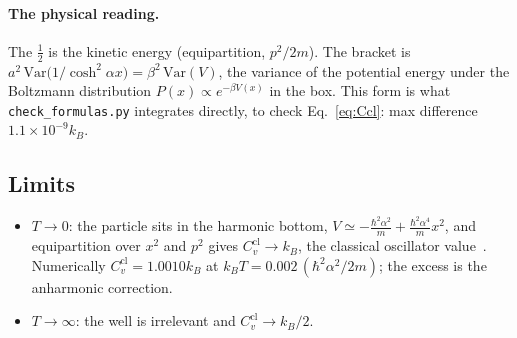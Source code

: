 \documentclass[11pt]{article}
\numberwithin{equation}{section}
\newcommand{\Ccl}{C_v^{\mathrm{cl}}}
\newcommand{\kB}{k_{B}}
\newcommand{\Eu}{\hbar^2\alpha^2/2m}
\begin{document}
\paragraph{The physical reading.} The $\frac12$ is the kinetic energy (equipartition, $p^2/2m$). The bracket is $a^2\,\mathrm{Var}\big(1/\cosh^2\alpha x\big)=\beta^2\,\mathrm{Var}(V)$, the variance of the potential energy under the Boltzmann distribution $P(x)\propto e^{-\beta V(x)}$ in the box. This form is what \texttt{check\_formulas.py} integrates directly, to check Eq.~\eqref{eq:Ccl}: max difference $1.1\times10^{-9}\kB$.

\subsection{Limits}
\begin{itemize}[itemsep=2pt]
\item $T\to0$: the particle sits in the harmonic bottom, $V\simeq-\frac{\hbar^2\alpha^2}{m}+\frac{\hbar^2\alpha^4}{m}x^2$, and equipartition over $x^2$ and $p^2$ gives $\Ccl\to\kB$, the classical oscillator value~\cite[p.~95]{LGK}. Numerically $\Ccl=1.0010\kB$ at $\kB T=0.002\,(\Eu)$; the excess is the anharmonic correction.
\item $T\to\infty$: the well is irrelevant and $\Ccl\to\kB/2$.
\end{itemize}

\end{document}
